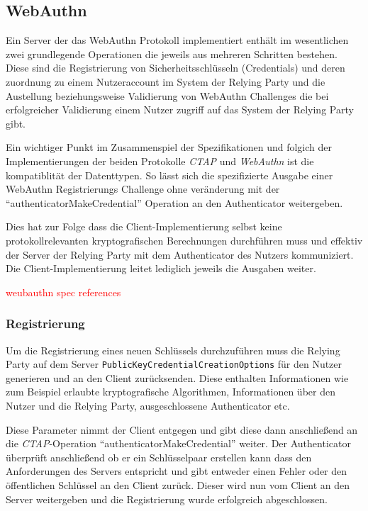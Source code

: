 \documentclass[journal]{IEEEtran}
\begin{document}
\subsection{WebAuthn}

Ein Server der das WebAuthn Protokoll implementiert enthält im wesentlichen
zwei grundlegende Operationen die jeweils aus mehreren Schritten bestehen.
Diese sind die Registrierung von Sicherheitsschlüsseln (Credentials) und deren
zuordnung zu einem Nutzeraccount im System der Relying Party und die
Austellung beziehungsweise Validierung von WebAuthn Challenges die bei
erfolgreicher Validierung einem Nutzer zugriff auf das System der Relying Party
gibt.

Ein wichtiger Punkt im Zusammenspiel der Spezifikationen und folgich der
Implementierungen der beiden Protokolle \textit{CTAP} und \textit{WebAuthn} ist
die kompatiblität der Datenttypen. So lässt sich die spezifizierte Ausgabe
einer WebAuthn Registrierungs Challenge ohne veränderung mit der
``authenticatorMakeCredential'' Operation an den Authenticator weitergeben.

Dies hat zur Folge dass die Client-Implementierung selbst keine
protokollrelevanten kryptografischen Berechnungen durchführen muss und effektiv
der Server der Relying Party mit dem Authenticator des Nutzers kommuniziert.
Die Client-Implementierung leitet lediglich jeweils die Ausgaben weiter.

\textcolor{red}{weubauthn spec references}

\subsubsection{Registrierung}

Um die Registrierung eines neuen Schlüssels durchzuführen muss die Relying
Party auf dem Server \texttt{PublicKeyCredentialCreationOptions} für den Nutzer
generieren und an den Client zurücksenden. Diese enthalten Informationen wie
zum Beispiel erlaubte kryptografische Algorithmen, Informationen über den
Nutzer und die Relying Party, ausgeschlossene Authenticator etc.

Diese Parameter nimmt der Client entgegen und gibt diese dann anschließend an
die \textit{CTAP}-Operation ``authenticatorMakeCredential'' weiter. Der
Authenticator überprüft anschließend ob er ein Schlüsselpaar erstellen kann
dass den Anforderungen des Servers entspricht und gibt entweder einen Fehler
oder den öffentlichen Schlüssel an den Client zurück. Dieser wird nun vom
Client an den Server weitergeben und die Registrierung wurde erfolgreich
abgeschlossen.
\end{document}
